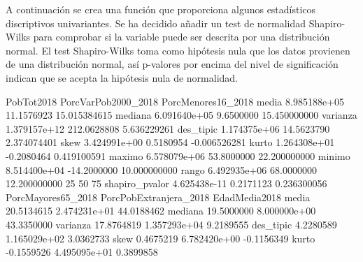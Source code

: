 \documentclass[11pt]{article}
\begin{document}
A continuación se crea una función que proporciona algunos estadísticos discriptivos univariantes. Se ha decidido añadir un test de normalidad Shapiro-Wilks para comprobar si la variable puede ser descrita por una distribución normal. El test Shapiro-Wilks toma como hipótesis nula que los datos provienen de una distribución normal, así p-valores por encima del nivel de significación indican que se acepta la hipótesis nula de normalidad. 
\begin{Schunk}
\begin{Soutput}
                 PobTot2018 PorcVarPob2000_2018 PorcMenores16_2018
media          8.985188e+05          11.1576923       15.015384615
mediana        6.091640e+05           9.6500000       15.450000000
varianza       1.379157e+12         212.0628808        5.636229261
des_tipic      1.174375e+06          14.5623790        2.374074401
skew           3.424991e+00           0.5180954       -0.006526281
kurto          1.264308e+01          -0.2080464        0.419100591
maximo         6.578079e+06          53.8000000       22.200000000
minimo         8.514400e+04         -14.2000000       10.000000000
rango          6.492935e+06          68.0000000       12.200000000
25%            3.255698e+05           0.4500000       13.750000000
50%            6.091640e+05           9.6500000       15.450000000
75%            1.020944e+06          20.1750000       16.350000000
shapiro_pvalor 4.625438e-11           0.2171123        0.236300056
               PorcMayores65_2018 PorcPobExtranjera_2018 EdadMedia2018
media                  20.5134615           2.474231e+01    44.0188462
mediana                19.5000000           8.000000e+00    43.3350000
varianza               17.8764819           1.357293e+04     9.2189555
des_tipic               4.2280589           1.165029e+02     3.0362733
skew                    0.4675219           6.782420e+00    -0.1156349
kurto                  -0.1559526           4.495095e+01     0.3899858

\end{Soutput}
\end{Schunk}
\end{document}

